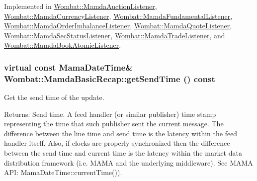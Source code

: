 Implemented in \hyperlink{classWombat_1_1MamdaAuctionListener_c73a0f3c19ad3a9106925e6fa89599ef}{Wombat::Mamda\-Auction\-Listener}, \hyperlink{classWombat_1_1MamdaCurrencyListener_a1c7db47ff4db093c4d13fddc44fd7e6}{Wombat::Mamda\-Currency\-Listener}, \hyperlink{classWombat_1_1MamdaFundamentalListener_b5796fc4bfc42902dbe4c39b3f1640bb}{Wombat::Mamda\-Fundamental\-Listener}, \hyperlink{classWombat_1_1MamdaOrderImbalanceListener_e5911efbbda1cb87fb25f7869a01a103}{Wombat::Mamda\-Order\-Imbalance\-Listener}, \hyperlink{classWombat_1_1MamdaQuoteListener_35e889726482c3d6865c20adfd311e0b}{Wombat::Mamda\-Quote\-Listener}, \hyperlink{classWombat_1_1MamdaSecStatusListener_3772a00bb836461eb5dac1a57631b000}{Wombat::Mamda\-Sec\-Status\-Listener}, \hyperlink{classWombat_1_1MamdaTradeListener_dca5ca34bb9de2bdd8579a618dda72dd}{Wombat::Mamda\-Trade\-Listener}, and \hyperlink{classWombat_1_1MamdaBookAtomicListener_74f25a0ce9a9b71b44d482017457e260}{Wombat::Mamda\-Book\-Atomic\-Listener}.\hypertarget{classWombat_1_1MamdaBasicRecap_b9425853ac2dfb00d16d68381abae187}{
\subsubsection[getSendTime]{\setlength{\rightskip}{0pt plus 5cm}virtual const Mama\-Date\-Time\& Wombat::Mamda\-Basic\-Recap::get\-Send\-Time () const}}
\label{classWombat_1_1MamdaBasicRecap_b9425853ac2dfb00d16d68381abae187}


Get the send time of the update. 

\begin{Desc}
\item[Returns:]Send time. A feed handler (or similar publisher) time stamp representing the time that such publisher sent the current message. The difference between the line time and send time is the latency within the feed handler itself. Also, if clocks are properly synchronized then the difference between the send time and current time is the latency within the market data distribution framework (i.e. MAMA and the underlying middleware). See MAMA API: Mama\-Date\-Time::current\-Time()). \end{Desc}


